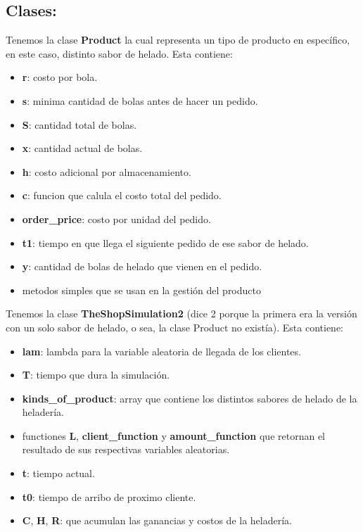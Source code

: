 \documentclass[12pt,a4paper]{article}
\begin{document}
\begin{flushleft}
\subsection*{Clases:}
Tenemos la clase \textbf{Product} la cual representa un tipo de producto en específico, en este caso, distinto sabor de helado. Esta contiene:
\begin{itemize}
\item \textbf{r}: costo por bola.
\item \textbf{s}: minima cantidad de bolas antes de hacer un pedido.
\item \textbf{S}: cantidad total de bolas.
\item \textbf{x}: cantidad actual de bolas.
\item \textbf{h}: costo adicional por almacenamiento.
\item \textbf{c}: funcion que calula el costo total del pedido.
\item \textbf{order\_price}: costo por unidad del pedido.
\item \textbf{t1}: tiempo en que llega el siguiente pedido de ese sabor de helado.
\item \textbf{y}: cantidad de bolas de helado que vienen en el pedido.
\item metodos simples que se usan en la gestión del producto
\end{itemize}

Tenemos la clase \textbf{TheShopSimulation2} (dice 2 porque la primera era la versión con un solo sabor de helado, o sea, la clase Product no existía). Esta contiene:
\begin{itemize}
\item \textbf{lam}: lambda para la variable aleatoria de llegada de los clientes.
\item \textbf{T}: tiempo que dura la simulación.
\item \textbf{kinds\_of\_product}: array que contiene los distintos sabores de helado de la heladería.
\item functiones \textbf{L},\textbf{ client\_function} y \textbf{amount\_function} que retornan el resultado de sus respectivas variables aleatorias.
\item \textbf{t}: tiempo actual.
\item \textbf{t0}: tiempo de arribo de proximo cliente.
\item \textbf{C}, \textbf{H}, \textbf{R}: que acumulan las ganancias y costos de la heladería.
\end{itemize}


\end{flushleft}
\end{document}
